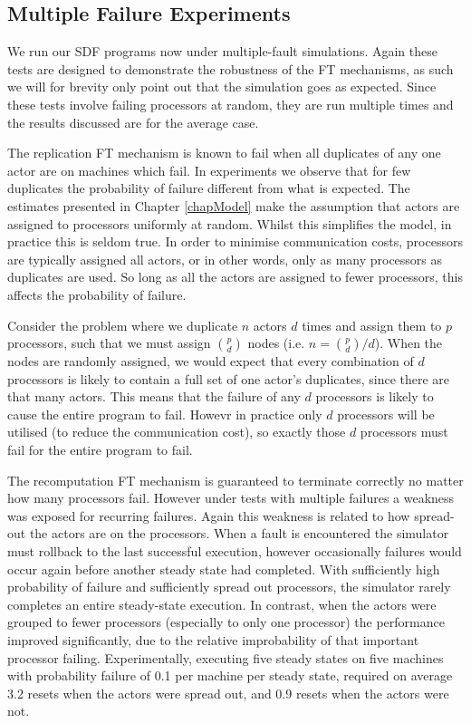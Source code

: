 \subsection{Multiple Failure Experiments}
\label{secExMultiFail}

We run our SDF programs now under multiple-fault simulations.
Again these tests are designed to demonstrate the robustness of the FT mechanisms, as such we will for brevity only point out that the simulation goes as expected.
Since these tests involve failing processors at random, they are run multiple times and the results discussed are for the average case.

The replication FT mechanism is known to fail when all duplicates of any one actor are on machines which fail.
In experiments we observe that for few duplicates the probability of failure different from what is expected.
The estimates presented in Chapter \ref{chapModel} make the assumption that actors are assigned to processors uniformly at random.
Whilst this simplifies the model, in practice this is seldom true.
In order to minimise communication costs, processors are typically assigned all actors, or in other words, only as many processors as duplicates are used.
So long as all the actors are assigned to fewer processors, this affects the probability of failure.

Consider the problem where we duplicate $n$ actors $d$ times and assign them to $p$ processors, such that we must assign $\binom{p}{d}$ nodes (i.e. $n = \binom{p}{d}/d$).
When the nodes are randomly assigned, we would expect that every combination of $d$ processors is likely to contain a full set of one actor's duplicates, since there are that many actors.
This means that the failure of any $d$ processors is likely to cause the entire program to fail.
Howevr in practice only $d$ processors will be utilised (to reduce the communication cost), so exactly those $d$ processors must fail for the entire program to fail.

The recomputation FT mechanism is guaranteed to terminate correctly no matter how many processors fail.
However under tests with multiple failures a weakness was exposed for recurring failures.
Again this weakness is related to how spread-out the actors are on the processors.
When a fault is encountered the simulator must rollback to the last successful execution, however occasionally failures would occur again before another steady state had completed.
With sufficiently high probability of failure and sufficiently spread out processors, the simulator rarely completes an entire steady-state execution.
In contrast, when the actors were grouped to fewer processors (especially to only one processor) the performance improved significantly, due to the relative improbability of that important processor failing.
Experimentally, executing five steady states on five machines with probability failure of 0.1 per machine per steady state, required on average 3.2 resets when the actors were spread out, and 0.9 resets when the actors were not.

